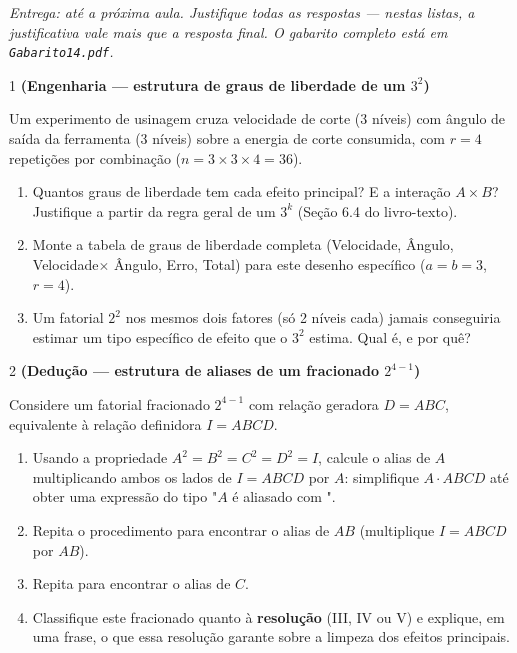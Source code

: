 \documentclass[11pt]{article}
\begin{document}

\noindent \textit{Entrega: até a próxima aula. Justifique todas as respostas --- nestas listas, a
justificativa vale mais que a resposta final. O gabarito completo está em \texttt{Gabarito14.pdf}.}

\begin{questao}{1} \textbf{(Engenharia --- estrutura de graus de liberdade de um $3^2$)}

Um experimento de usinagem cruza velocidade de corte (3 níveis) com ângulo de saída da ferramenta
(3 níveis) sobre a energia de corte consumida, com $r=4$ repetições por combinação
($n=3\times3\times4=36$).

\begin{enumerate}[label=(\alph*)]
  \item Quantos graus de liberdade tem cada efeito principal? E a interação $A{\times}B$?
    Justifique a partir da regra geral de um $3^k$ (Seção 6.4 do livro-texto).
  \item Monte a tabela de graus de liberdade completa (Velocidade, Ângulo, Velocidade$\times$
    Ângulo, Erro, Total) para este desenho específico ($a=b=3$, $r=4$).
  \item Um fatorial $2^2$ nos mesmos dois fatores (só 2 níveis cada) jamais conseguiria estimar um
    tipo específico de efeito que o $3^2$ estima. Qual é, e por quê?
\end{enumerate}
\end{questao}

\begin{questao}{2} \textbf{(Dedução --- estrutura de aliases de um fracionado $2^{4-1}$)}

Considere um fatorial fracionado $2^{4-1}$ com relação geradora $D=ABC$, equivalente à relação
definidora $I=ABCD$.

\begin{enumerate}[label=(\alph*)]
  \item Usando a propriedade $A^2=B^2=C^2=D^2=I$, calcule o alias de $A$ multiplicando ambos os
    lados de $I=ABCD$ por $A$: simplifique $A\cdot ABCD$ até obter uma expressão do tipo
    "$A$ é aliasado com \underline{\hspace{2cm}}".
  \item Repita o procedimento para encontrar o alias de $AB$ (multiplique $I=ABCD$ por $AB$).
  \item Repita para encontrar o alias de $C$.
  \item Classifique este fracionado quanto à \textbf{resolução} (III, IV ou V) e explique, em uma
    frase, o que essa resolução garante sobre a limpeza dos efeitos principais.
\end{enumerate}
\end{questao}
\end{document}
